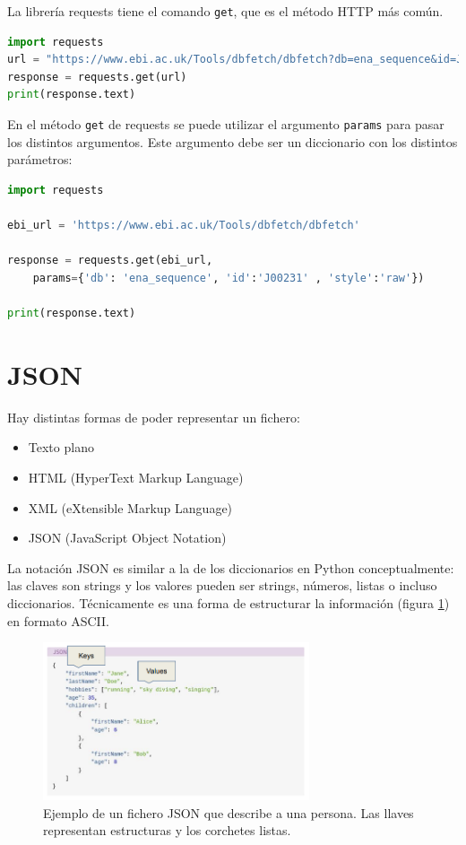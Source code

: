 La librería requests tiene el comando \texttt{get}, que es el método HTTP más común. 
\begin{lstlisting}[language=Python]
import requests
url = "https://www.ebi.ac.uk/Tools/dbfetch/dbfetch?db=ena_sequence&id=J00231&style=raw"
response = requests.get(url)
print(response.text)
\end{lstlisting}

En el método \texttt{get} de requests se puede utilizar el argumento \texttt{params} para pasar los distintos argumentos. Este argumento debe ser un diccionario con los distintos parámetros:
\begin{lstlisting}[language=Python]
import requests

ebi_url = 'https://www.ebi.ac.uk/Tools/dbfetch/dbfetch'

response = requests.get(ebi_url,
    params={'db': 'ena_sequence', 'id':'J00231' , 'style':'raw'})

print(response.text)
\end{lstlisting}

\section{JSON}
Hay distintas formas de poder representar un fichero:
\begin{itemize}
\item Texto plano
\item HTML (HyperText Markup Language)
\item XML (eXtensible Markup Language)
\item JSON (JavaScript Object Notation)
\end{itemize}

La notación JSON es similar a la de los diccionarios en Python conceptualmente: las claves son strings y los valores pueden ser strings, números, listas o incluso diccionarios. Técnicamente es una forma de estructurar la información (figura \ref{fig:json}) en formato ASCII. 

\begin{figure}[htbp]
\centering
\includegraphics[width = 0.7\textwidth]{figs/json.png}
\caption{Ejemplo de un fichero JSON que describe a una persona. Las llaves representan estructuras y los corchetes listas.}
\label{fig:json}
\end{figure}

